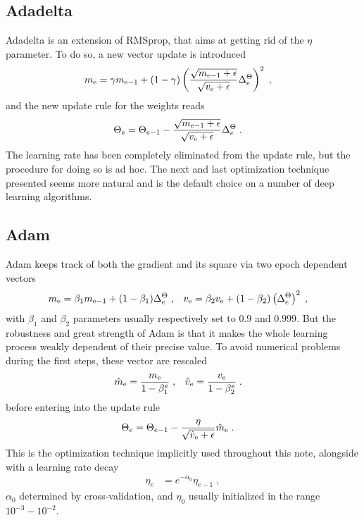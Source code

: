 \subsection{Adadelta}

Adadelta\cite{journals/corr/abs-1212-5701} is an extension of RMSprop, that aims at getting rid of the $\eta$ parameter. To do so, a new vector update is introduced
\begin{align}
m_{{\rm e}}&=\gamma m_{{\rm e-1}}+(1-\gamma )
%
\left(\frac{\sqrt{m_{{\rm e-1}}+\epsilon}}{\sqrt{v_{{\rm e}}+\epsilon}}\Delta^{\Theta}_{e}\right)^2\;,
\end{align}
and the new update rule for the weights reads
\begin{align}
\Theta_e&=\Theta_{e-1}-\frac{\sqrt{m_{{\rm e-1}}+\epsilon}}{\sqrt{v_{{\rm e}}+\epsilon}}\Delta^{\Theta}_{e}\;.
\end{align}
The learning rate has been completely eliminated from the update rule, but the procedure for doing so is ad hoc. The next and last optimization technique presented seems more natural and is the default choice on a number of deep learning algorithms.
\subsection{Adam}

Adam\cite{Kingma2014} keeps track of both the gradient and its square via two epoch dependent vectors
\begin{align}
m_{{\rm e}}&= \beta_1 m_{{\rm e-1}}+ (1-\beta_1)\Delta^{\Theta}_{e}\;,&
%
v_{{\rm e}}&= \beta_2 v_{{\rm e}}+ (1-\beta_2)\left(\Delta^{\Theta}_{e}\right)^2\;,
\end{align}
with $\beta_1$ and $\beta_2$ parameters usually respectively set to $0.9$ and $0.999$. But the robustness and great strength of Adam is that it makes the whole learning process weakly dependent of their precise value. To avoid numerical problems during the first steps, these vector are rescaled
\begin{align}
\hat{m}_{{\rm e}}&= \frac{m_{{\rm e}}}{1-\beta_1^{e}}\;,&
%
\hat{v}_{{\rm e}}&= \frac{v_{{\rm e}}}{1-\beta_2^{e}}\;.
\end{align}
before entering into the update rule
\begin{align}
\Theta_e&=\Theta_{e-1}-\frac{\eta }{\sqrt{\hat{v}_{{\rm e}}+\epsilon}}\hat{m}_{{\rm e}}\;.
\end{align}
This is the optimization technique implicitly used throughout this note, alongside with a learning rate decay
\begin{align}
\eta_e&=e^{-\alpha_0}\eta_{e-1}\;,
\end{align}
$\alpha_0$ determined by cross-validation, and $\eta_0$ usually initialized in the range $10^{-3}-10^{-2}$.

